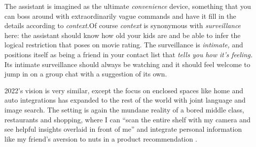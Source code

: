 The assistant is imagined as the ultimate \emph{convenience} device,
something that you can boss around with extraordinarily vague commands
and have it fill in the details according to \emph{context.}Of course
\emph{context} is synonymous with \emph{surveillance} here: the
assistant should know how old your kids are and be able to infer the
logical restriction that poses on movie rating. The surveillance is
\emph{intimate,} and positions itself as being a friend in your
contact list that \emph{tells you how it's feeling.} Its intimate
surveillance should always be watching and it should feel welcome to
jump in on a group chat with a suggestion of its own.

2022's vision is very similar, except the focus on enclosed spaces like
home and auto integrations has expanded to the rest of the world with
joint language and image search. The setting is again the mundane
reality of a bored middle class, restaurants and shopping, where I can
``scan the entire shelf with my camera and see helpful insights overlaid
in front of me'' and integrate personal
information like my friend's aversion to nuts in a product
recommendation \cite{googleGoogleKeynoteGoogle2022} .

